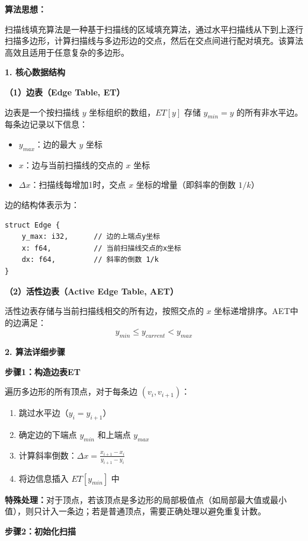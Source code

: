 ﻿\documentclass[12pt,a4paper]{article}
\begin{document}
\begin{tcolorbox}[breakable]
\textbf{算法思想：}

扫描线填充算法是一种基于扫描线的区域填充算法，通过水平扫描线从下到上逐行扫描多边形，计算扫描线与多边形边的交点，然后在交点间进行配对填充。该算法高效且适用于任意复杂的多边形。

\textbf{1. 核心数据结构}

\textbf{（1）边表（Edge Table, ET）}

边表是一个按扫描线 $y$ 坐标组织的数组，$ET[y]$ 存储 $y_{min} = y$ 的所有非水平边。每条边记录以下信息：
\begin{itemize}
\item $y_{max}$：边的最大 $y$ 坐标
\item $x$：边与当前扫描线的交点的 $x$ 坐标
\item $\Delta x$：扫描线每增加1时，交点 $x$ 坐标的增量（即斜率的倒数 $1/k$）
\end{itemize}

边的结构体表示为：
\begin{verbatim}
struct Edge {
    y_max: i32,      // 边的上端点y坐标
    x: f64,          // 当前扫描线交点的x坐标
    dx: f64,         // 斜率的倒数 1/k
}
\end{verbatim}

\textbf{（2）活性边表（Active Edge Table, AET）}

活性边表存储与当前扫描线相交的所有边，按照交点的 $x$ 坐标递增排序。AET中的边满足：
\begin{equation}
y_{min} \leq y_{current} < y_{max}
\end{equation}

\textbf{2. 算法详细步骤}

\textbf{步骤1：构造边表ET}

遍历多边形的所有顶点，对于每条边 $(v_i, v_{i+1})$：
\begin{enumerate}
\item 跳过水平边（$y_i = y_{i+1}$）
\item 确定边的下端点 $y_{min}$ 和上端点 $y_{max}$
\item 计算斜率倒数：$\Delta x = \frac{x_{i+1} - x_i}{y_{i+1} - y_i}$
\item 将边信息插入 $ET[y_{min}]$ 中
\end{enumerate}

\textbf{特殊处理：}对于顶点，若该顶点是多边形的局部极值点（如局部最大值或最小值），则只计入一条边；若是普通顶点，需要正确处理以避免重复计数。

\textbf{步骤2：初始化扫描}


\end{tcolorbox}
\end{document}
